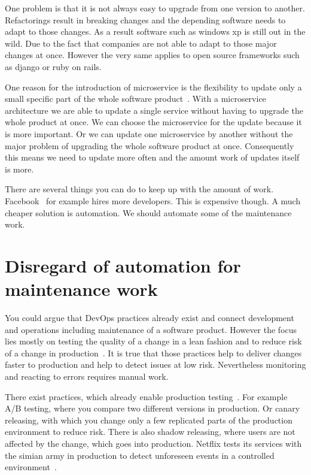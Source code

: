 One problem is that it is not always easy to upgrade from one version to
another. Refactorings result in breaking changes and the depending software needs to adapt
to those changes. As a result software such as windows xp is still out in the wild. Due to
the fact that companies are not able to adapt to those major changes at once. However the
very same applies to open source frameworks such as django or ruby on rails.

One reason for the introduction of microservice is the flexibility to update only a small
specific part of the whole software product~\cite{microservices_fowler}. With a
microservice architecture we are able to update a single service without having to upgrade
the whole product at once. We can choose the microservice for the update because it is
more important. Or we can update one microservice by another without the major problem of
upgrading the whole software product at once. Consequently this means we need to update
more often and the amount work of updates itself is more.

There are several things you can do to keep up with the amount of
work. Facebook~\cite{dev_at_fb} for example hires more developers. This is expensive
though. A much cheaper solution is automation. We should automate some of the maintenance
work.

\section{Disregard of automation for maintenance work}

You could argue that DevOps practices already exist and connect development and operations
including maintenance of a software product. However the focus lies mostly on testing the
quality of a change in a lean fashion and to reduce risk of a change in
production~\cite{devops_definition}. It is true that those practices help to deliver
changes faster to production and help to detect issues at low risk. Nevertheless
monitoring and reacting to errors requires manual work.

There exist practices, which already enable production testing~\cite{dev_at_fb}. For
example A/B testing, where you compare two different versions in production. Or canary
releasing, with which you change only a few replicated parts of the production environment
to reduce risk. There is also shadow releasing, where users are not affected by the
change, which goes into production. Netflix tests its services with the simian army in
production to detect unforeseen events in a controlled environment~\cite{antifragile_org}.


